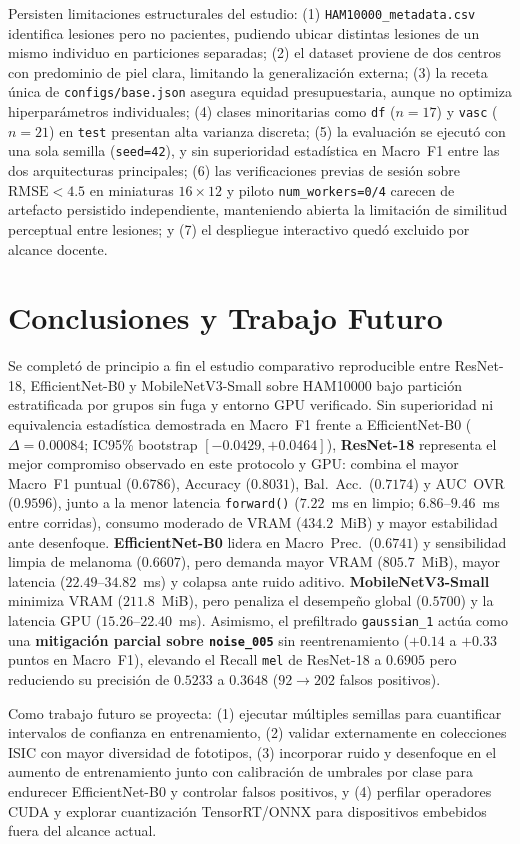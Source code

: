 \documentclass[conference]{IEEEtran}
\begin{document}
Persisten limitaciones estructurales del estudio: (1) \texttt{HAM10000\_metadata.csv} identifica lesiones pero no pacientes, pudiendo ubicar distintas lesiones de un mismo individuo en particiones separadas; (2) el dataset proviene de dos centros con predominio de piel clara, limitando la generalizaci\'on externa; (3) la receta \'unica de \texttt{configs/base.json} asegura equidad presupuestaria, aunque no optimiza hiperpar\'ametros individuales; (4) clases minoritarias como \texttt{df} ($n=17$) y \texttt{vasc} ($n=21$) en \texttt{test} presentan alta varianza discreta; (5) la evaluaci\'on se ejecut\'o con una sola semilla (\texttt{seed=42}), y sin superioridad estad\'istica en Macro~F1 entre las dos arquitecturas principales; (6) las verificaciones previas de sesi\'on sobre $\mathrm{RMSE}<4.5$ en miniaturas $16\times 12$ y piloto \texttt{num\_workers=0/4} carecen de artefacto persistido independiente, manteniendo abierta la limitaci\'on de similitud perceptual entre lesiones; y (7) el despliegue interactivo qued\'o excluido por alcance docente.

\section{Conclusiones y Trabajo Futuro}
Se complet\'o de principio a fin el estudio comparativo reproducible entre ResNet-18, EfficientNet-B0 y MobileNetV3-Small sobre HAM10000 bajo partici\'on estratificada por grupos sin fuga y entorno GPU verificado. Sin superioridad ni equivalencia estad\'istica demostrada en Macro~F1 frente a EfficientNet-B0 ($\Delta=0.00084$; IC95\% bootstrap $[-0.0429,+0.0464]$), \textbf{ResNet-18} representa el mejor compromiso observado en este protocolo y GPU: combina el mayor Macro~F1 puntual ($0.6786$), Accuracy ($0.8031$), Bal.\ Acc.\ ($0.7174$) y AUC~OVR ($0.9596$), junto a la menor latencia \texttt{forward()} ($7.22$~ms en limpio; $6.86\text{--}9.46$~ms entre corridas), consumo moderado de VRAM ($434.2$~MiB) y mayor estabilidad ante desenfoque. \textbf{EfficientNet-B0} lidera en Macro~Prec.\ ($0.6741$) y sensibilidad limpia de melanoma ($0.6607$), pero demanda mayor VRAM ($805.7$~MiB), mayor latencia ($22.49\text{--}34.82$~ms) y colapsa ante ruido aditivo. \textbf{MobileNetV3-Small} minimiza VRAM ($211.8$~MiB), pero penaliza el desempe\~no global ($0.5700$) y la latencia GPU ($15.26\text{--}22.40$~ms). Asimismo, el prefiltrado \texttt{gaussian\_1} act\'ua como una \textbf{mitigaci\'on parcial sobre \texttt{noise\_005}} sin reentrenamiento ($+0.14$ a $+0.33$ puntos en Macro~F1), elevando el Recall \texttt{mel} de ResNet-18 a $0.6905$ pero reduciendo su precisi\'on de $0.5233$ a $0.3648$ ($92 \to 202$ falsos positivos).

Como trabajo futuro se proyecta: (1) ejecutar m\'ultiples semillas para cuantificar intervalos de confianza en entrenamiento, (2) validar externamente en colecciones ISIC con mayor diversidad de fototipos, (3) incorporar ruido y desenfoque en el aumento de entrenamiento junto con calibraci\'on de umbrales por clase para endurecer EfficientNet-B0 y controlar falsos positivos, y (4) perfilar operadores CUDA y explorar cuantizaci\'on TensorRT/ONNX para dispositivos embebidos fuera del alcance actual.



\end{document}
